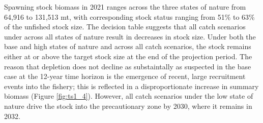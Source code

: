 \documentclass[11pt,
  english,
  a4paper,
]{article}
\begin{document}
\leavevmode\tagmcend\tagstructend\par


Spawning stock biomass in 2021 ranges across the three states of nature from 64,916 to 131,513 mt, with corresponding stock status ranging from 51\% to 63\% of the unfished stock size. The decision table suggests that all catch scenarios under across all states of nature result in decreases in stock size. Under both the base and high states of nature and across all catch scenarios, the stock remains either at or above the target stock size at the end of the projection period. The reason that depletion does not decline as substaintally as suspected in the base case at the 12-year time horizon is the emergence of recent, large recruitment events into the fishery; this is reflected in a disproportionate increase in summary biomass (Figure \ref{fig:ts1_4}). However, all catch scenarios under the low state of nature drive the stock into the precautionary zone by 2030, where it remains in 2032.

\leavevmode\tagmcend\tagstructend\par

\clearpage
\end{document}
